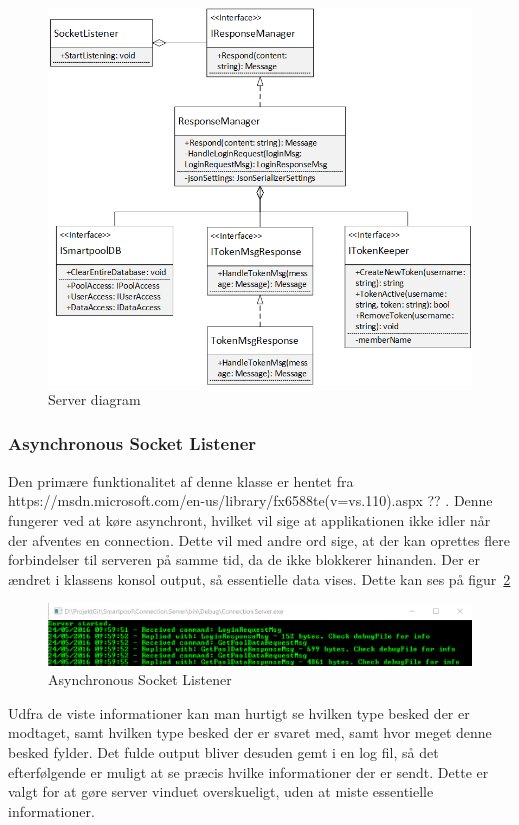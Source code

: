 \begin{figure}
	\centering
	\includegraphics[width=0.9\linewidth]{figs/connection/ConnectionServer.png}
	\caption{Server diagram}
	\label{fig:ConnectionServer}
\end{figure}

\subsubsection{Asynchronous Socket Listener}
Den primære funktionalitet af denne klasse er hentet fra https://msdn.microsoft.com/en-us/library/fx6588te(v=vs.110).aspx ?? . Denne fungerer ved at køre asynchront, hvilket vil sige at applikationen ikke idler når der afventes en connection. Dette vil med andre ord sige, at der kan oprettes flere forbindelser til serveren på samme tid, da de ikke blokkerer hinanden.
Der er ændret i klassens konsol output, så essentielle data vises. Dette kan ses på figur~\ref{fig:asynchronousSocketListener}

\begin{figure}
	\centering
	\includegraphics[width=0.9\linewidth]{figs/connection/asynchronousSocketListener.png}
	\caption{Asynchronous Socket Listener}
	\label{fig:asynchronousSocketListener}
\end{figure}

Udfra de viste informationer kan man hurtigt se hvilken type besked der er modtaget, samt hvilken type besked der er svaret med, samt hvor meget denne besked fylder. Det fulde output bliver desuden gemt i en log fil, så det efterfølgende er muligt at se præcis hvilke informationer der er sendt. Dette er valgt for at gøre server vinduet overskueligt, uden at miste essentielle informationer.

